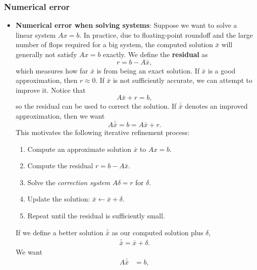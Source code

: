 \documentclass{report}
\begin{document}
    \subsubsection{Numerical error}
    \begin{itemize}
        \item \textbf{Numerical error when solving systems}: 
            Suppose we want to solve a linear system $Ax = b$. 
            In practice, due to floating-point roundoff and the large number of flops required for a big system, 
            the computed solution $\bar{x}$ will generally not satisfy $Ax = b$ exactly. 
            \bigbreak \noindent 
            We define the \textbf{residual} as
            \[
                r = b - A\bar{x},
            \]
            which measures how far $\bar{x}$ is from being an exact solution. 
            If $\bar{x}$ is a good approximation, then $r \approx 0$. 
            \bigbreak \noindent 
            If $\bar{x}$ is not sufficiently accurate, we can attempt to improve it. 
            Notice that
            \[
                A\bar{x} + r = b,
            \]
            so the residual can be used to correct the solution. 
            If $\bar{\bar{x}}$ denotes an improved approximation, then we want
            \[
                A\bar{\bar{x}} = b = A\bar{x} + r.
            \]
            \bigbreak \noindent 
            This motivates the following iterative refinement process:
            \begin{enumerate}
                \item Compute an approximate solution $\bar{x}$ to $Ax = b$.
                \item Compute the residual $r = b - A\bar{x}$.
                \item Solve the \emph{correction system} $A\delta = r$ for $\delta$.
                \item Update the solution: $\bar{x} \leftarrow \bar{x} + \delta$.
                \item Repeat until the residual is sufficiently small.
            \end{enumerate}
            \bigbreak \noindent 
            If we define a better solution $\bar{\bar{x}}$ as our computed solution plus $\delta$,
            \begin{align*}
                \bar{\bar{x}} = \bar{x} + \delta
            .\end{align*}
            We want
            \begin{align*}
                A\bar{\bar{x}} &= b, \\

\end{align*}
\end{itemize}
\end{document}
